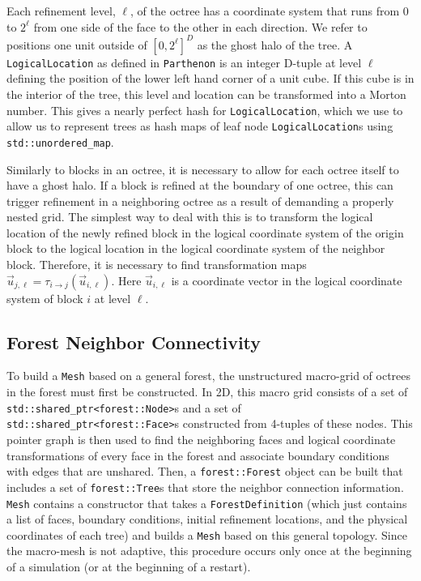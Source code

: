 \documentclass{article}
\begin{document}

Each refinement level, $\ell$, of the octree has a coordinate system that runs from 0 to $2^\ell$ from one side of the face to the other in each direction. We refer to positions one unit outside of $[0, 2^\ell]^D$ as the ghost halo of the tree. A \texttt{LogicalLocation} as defined in \texttt{Parthenon} is an integer D-tuple at level $\ell$ defining the position of the lower left hand corner of a unit cube. If this cube is in the interior of the tree, this level and location can be transformed into a Morton number. This gives a nearly perfect hash for \texttt{LogicalLocation}, which we use to allow us to represent trees as hash maps of leaf node \texttt{LogicalLocation}s using \texttt{std::unordered\_map}.

Similarly to blocks in an octree, it is necessary to allow for each octree itself to have a ghost halo. If a block is refined at the boundary of one octree, this can trigger refinement in a neighboring octree as a result of demanding a properly nested grid. The simplest way to deal with this is to transform the logical location of the newly refined block in the logical coordinate system of the origin block to the logical location in the logical coordinate system of the neighbor block. Therefore, it is necessary to find transformation maps $\vec{u}_{j,\ell} = \tau_{i \rightarrow j}(\vec{u}_{i, \ell})$. Here $\vec{u}_{i, \ell}$ is a coordinate vector in the logical coordinate system of block $i$ at level $\ell$. 

\subsection{Forest Neighbor Connectivity}
To build a \texttt{Mesh} based on a general forest, the unstructured macro-grid of octrees in the forest must first be constructed. In 2D, this macro grid consists of a set of \texttt{std::shared\_ptr<forest::Node>}s and a set of \texttt{std::shared\_ptr<forest::Face>}s constructed from 4-tuples of these nodes. This pointer graph is then used to find the neighboring faces and logical coordinate transformations of every face in the forest and associate boundary conditions with edges that are unshared. Then, a \texttt{forest::Forest} object can be built that includes a set of \texttt{forest::Tree}s that store the neighbor connection information. \texttt{Mesh} contains a constructor that takes a \texttt{ForestDefinition} (which just contains a list of faces, boundary conditions, initial refinement locations, and the physical coordinates of each tree) and builds a \texttt{Mesh} based on this general topology. Since the macro-mesh is not adaptive, this procedure occurs only once at the beginning of a simulation (or at the beginning of a restart). 
\end{document}
